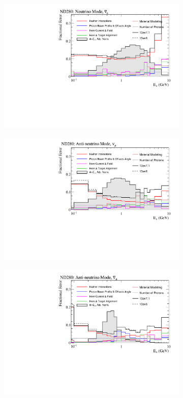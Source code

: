 \begin{figure}
\begin{subfigure}{.49\textwidth}
\end{subfigure}
\begin{subfigure}{.49\textwidth}
  \centering
  \includegraphics[width=0.99\linewidth]{figs/flux_error_t2k_nd5_fhc_nuebar}
\end{subfigure}
\begin{subfigure}{.49\textwidth}
  \centering
  \includegraphics[width=0.99\linewidth]{figs/flux_error_t2k_nd5_rhc_numu}
\end{subfigure}
\begin{subfigure}{.49\textwidth}
  \centering
  \includegraphics[width=0.99\linewidth]{figs/flux_error_t2k_nd5_rhc_numubar}

\end{subfigure}
\end{figure}
